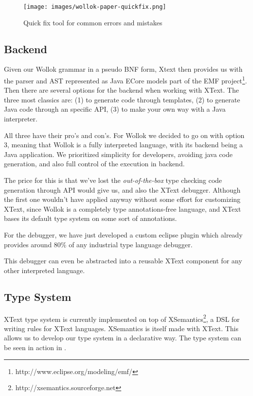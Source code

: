 \begin{figure}[ht]
    \centering
	\texttt{[image: images/wollok-paper-quickfix.png]}
    \caption{Quick fix tool for common errors and mistakes}
    \label{fig:quickfix.png}
\end{figure}

\subsection{Backend}
Given our Wollok grammar in a pseudo BNF form, Xtext then provides us with the parser and AST represented as Java ECore models part of the EMF project\footnote{http://www.eclipse.org/modeling/emf/}. 
Then there are several options for the backend when working with XText. The three most classics are: (1) to generate code through templates, (2) to generate Java code through an specific API, (3) to make your own way with a Java interpreter.

All three have their pro’s and con’s. For Wollok we decided to go on with option 3, meaning that Wollok is a fully interpreted language, with its backend being a Java application.
We prioritized simplicity for developers, \eg avoiding java code generation, and also full control of the execution in backend. 

The price for this is that we’ve lost the \emph{out-of-the-box} type checking code generation through API would give us, and also the XText debugger.
Although the first one wouldn’t have applied anyway without some effort for
customizing XText, since Wollok is a completely type annotations-free language,
and XText bases its default type system on some sort of annotations.

For the debugger, we have just developed a custom eclipse plugin which already
provides around 80\% of any industrial type language debugger.

This debugger can even be abstracted into a reusable XText component for any other interpreted language.

\subsection{Type System}
XText type system is currently implemented on top of XSemantics\footnote{http://xsemantics.sourceforge.net}, a DSL for writing rules for XText languages. XSemantics is itself made with XText.
This allows us to develop our type system in a declarative way. The type system can be seen in action in .

